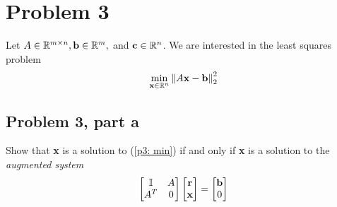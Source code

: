 \newpage
\section{Problem 3}
Let $A \in \mathbb{R}^{m \times n}, \textbf{b} \in \mathbb{R}^m,$ and $\textbf{c}\in \mathbb{R}^n$. We are interested in the least squares problem
\begin{align}
    \min_{\textbf{x}\in \mathbb{R}^n} \norm{A\textbf{x} - \textbf{b}}^2_2 \label{p3: min}
\end{align}
\subsection{Problem 3, part a}
Show that \textbf{x} is a solution to (\ref{p3: min}) if and only if \textbf{x} is a solution to the \textit{augmented system}
\begin{align}
    \begin{bmatrix}\mathbb{I} &A\\A^T&0\end{bmatrix}\begin{bmatrix}\textbf{r}\\\textbf{x}\end{bmatrix} = \begin{bmatrix}\textbf{b}\\0\end{bmatrix} \label{p3: augmented soln}
\end{align}
\partbreak

